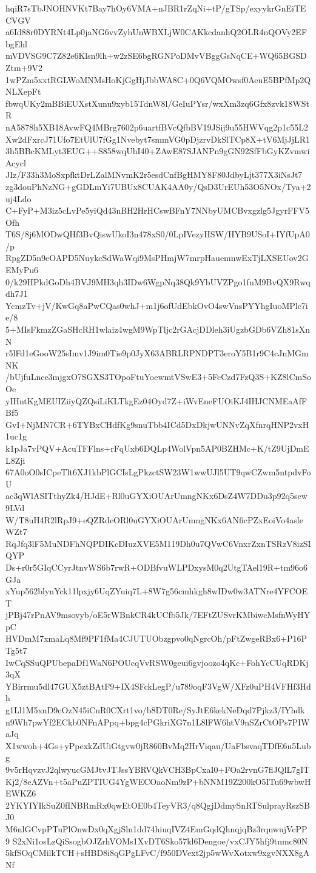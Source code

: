 hqiR7sTbJNOHNVKt7Bay7hOy6VMA+nJBR1rZqNi+tP/gTSp/exyykrGnEiTECVGV
a6Id88r0DYRNt4Lp0jaNG6vvZyhUnWBXLjW0CAKkcdanhQ2OLR4nQOVy2EFbgEhl
mVDVSG9C7Z82e6Klsn9lh+w2zSE6bgRGNPoDMvVBggGsNqCE+WQ65BGSDZtm+9V2
1wPZm5xxtRGLWoMNMsHoKjGgHjJbbWA8C+0Q6VQMOwsf0AeuE5BPfMp2QNLXepFt
fbwqUKy2mBBiEUXstXunu9xyb15TdnW8l/GeIuPYsr/wxXm3zq6Gfx8zvk18WStR
nA5878h5XB18AvwFQ4MBrg7602p6uartfBVcQfbBV19JSij9u55HWVqg2p1c55L2
Xw2dFxrcJ71Ufo7EtUlU7fGg1Nvebyt7smmVG0pDjzrvDkSlTCp8X+tV6MjJjLR1
3h5BBcKMLyt3EUG++S858wqUhI40+ZAwE87SJANPn9gGN92SfFbGyKZvmwiAcycl
JIz/F33h3MoSxpfktDrLZalMNvmK2r5esdCnfBgHMY8F80JdbyLjt377X3iNsJt7
zg3douPhNzNG+gGDLmYi7UBUx8CUAK4AA0y/QsD3UrEUh53O5NOx/Tya+2uj4Ldo
C+FyP+M3iz5cLvPe5yiQd43nBH2HrHCswBFnY7NNbyUMCBvxgzlg5JgyrFFV5Ofh
T6S/8j6MODwQHf3BvQiswUkoI3n478xS0/0LpIVezyHSW/HYB9USoI+IYfUpA0/p
RpgZD5n9eOAPD5NuykcSdWaWqi9MsPHmjW7mrpHauemnwExTjLXSEUov2GEMyPu6
0/k29HPkdGoDh4BVJ9MH3qh3IDw6WgpNq38Qk9YbUVZPgo1fnM9BvQX9Rwqdh7J1
YcmzTv+jV/KwGq8aPwCQas0whJ+m1j6ofUdEbkOvO4swVnsPYYhgIuoMPlc7ie/8
5+MIsFkmzZGaSHcRH1wlaiz4wgM9WpTljc2rGAcjDDleh3iUgzbGDb6VZh81sXnN
r5lFd1eGooW25sImv1J9im0Tie9p0JyX63ABRLRPNDPT3eroY5B1r9C4cJnMGmNK
/bUjfuLnce3mjgxO7SGXS3TOpoFtuYoewmtVSwE3+5FcCzd7FzQ3S+KZ8lCmSoOe
yIHntKgMEUIZiiyQZQsiLiKLTkgEz04Oyd7Z+iWvEneFUOiKJ4IHJCNMEaAfFBf5
GvI+NjMN7CR+6TYBxCHdfKg9snuTbb4ICd5DxDkjwUNNvZqXfnrqHNP2vxH1uc1g
k1pJa7vPQV+AcuTFFlns+rFqUxb6DQLp4WolVpn5AP0BZHMc+K/tZ9UjDmEL8Zji
67A0oO0sICpeTlt6XJ1kbPlGCIsLgPkzctSW23W1wwUJl5UT9qwCZwm5ntpdvFoU
ac3qWlASITthyZk4/HJdE+Rl0uGYXiOUArUmngNKx6DsZ4W7DDu3p92q5sew9LVd
W/T8uH4R2lRpJ9+eQZRdeORl0uGYXiOUArUmngNKx6ANficPZxEoiVo4asleWZt7
RqJfq3lF5MuNDFhNQPDIKcDIuzXVE5M119Dh0u7QVwC6VnxrZxnTSRzV8izSIQYP
Ds+r0r5GIqCCyrJtnvWS6b7rwR+ODBfvuWLPDxysM0q2UtgTAel19R+tm96o6GJa
xYup562blynYck11lpxjy6UqZYuiq7L+8W7g56cmhkgh8wIDw0w3ATNre4YFCOET
jPBj47rPnAV9msovyb/oE5rWBnkCR4kUCfb5Jk/7EFtZUSvrKMbiwcMsfnWyHYpC
HVDmM7xmaLq8Mf9PF1fMa4CJUTUObzgpvo0qNgrcOh/pFtZwgeRBx6+P16PTg5t7
IwCqSSuQPUbepaDf1WaN6POUcqVvRSW0geui6gvjoozo4qKc+FohYcCUqRDKj3qX
YBirrmu5dl47GUX5ztBAtF9+IX4SFckLegP/u789oqF3VgW/XFz0uPH4VFHf3Hdh
g1Ll1M5xnD9cOzN45iCnR0CXrt1vo/b8DT0Re/SyJtE6kekNeDqd7Pjkz3/IYhdk
n9Wh7pwYf2ECkb0NFnAPpq+bpg4cPGkriXG7n1L8lFW6htV9nSZrCtOPs7PIWaJq
X1wwoh+4Gs+yPpexkZdUiGtgvw0jR860BvMq2HrViqau/UaFbsvaqTDfE6u5Lubg
9v5rHqvzvJ2qlwyucGMJtvJTJssYBRVQkVCH3BpCxaI0+FOa2rvnG7flJQlL7gIT
Kj2/8eAZVn+t5aPuZPTIUG4YgWECOaoNm9zP+bNNM19Z200kO5ITu69wbwHEWKZ6
2YKYIYIkSuZ0fINBRmRx0qwEtOE0b4TeyVR3/q8QgjDdmySnRTSulprayRszSBJ0
M6nlGCvpPTuPlOnwDx0qXgjSln1dd74hiuqIVZ4EmGqdQhnqjqBz3rqnwujVcPP9
S2xNi1osLzQiSsogbOJZrhVOMs1XvDT6Sko57kl6Dengoe/vxCJY5hfj9tnmc80N
5kfSOqCMilkTCH+sHBD8i8qGPgLFvC/f950DVext2jp5wWvXotxw9xgvNXX8gANf

